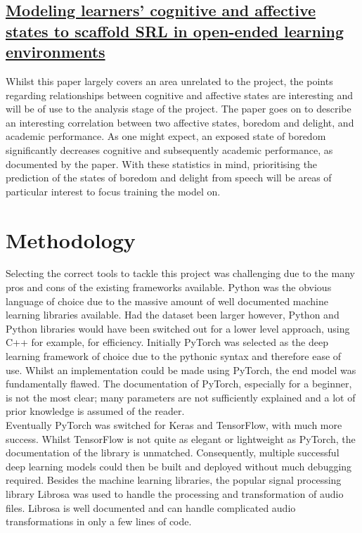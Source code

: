\documentclass[12pt]{article}
\begin{document}
\subsection{\href{https://www.researchgate.net/profile/Ryan-Baker-2/publication/326217846_Modeling_Learners'_Cognitive_and_Affective_States_to_Scaffold_SRL_in_Open-Ended_Learning_Environments/links/5b560a4245851507a7c3f516/Modeling-Learners-Cognitive-and-Affective-States-to-Scaffold-SRL-in-Open-Ended-Learning-Environments.pdf}{Modeling learners' cognitive and affective states to scaffold SRL in open-ended learning environments}}
Whilst this paper largely covers an area unrelated to the project, the points regarding relationships between cognitive and affective states are interesting and will be of use to the analysis stage of the project. The paper goes on to describe an interesting correlation between two affective states, boredom and delight, and academic performance. As one might expect, an exposed state of boredom significantly decreases cognitive and subsequently academic performance, as documented by the paper. With these statistics in mind, prioritising the prediction of the states of boredom and delight from speech will be areas of particular interest to focus training the model on.
\section{Methodology}
Selecting the correct tools to tackle this project was challenging due to the many pros and cons of the existing frameworks available. Python was the obvious language of choice due to the massive amount of well documented machine learning libraries available. Had the dataset been larger however, Python and Python libraries would have been switched out for a lower level approach, using C++ for example, for efficiency. Initially PyTorch was selected as the deep learning framework of choice due to the pythonic syntax and therefore ease of use. Whilst an implementation could be made using PyTorch, the end model was fundamentally flawed. The documentation of PyTorch, especially for a beginner, is not the most clear; many parameters are not sufficiently explained and a lot of prior knowledge is assumed of the reader.
\\

\noindent Eventually PyTorch was switched for Keras and TensorFlow, with much more success. Whilst TensorFlow is not quite as elegant or lightweight as PyTorch, the documentation of the library is unmatched. Consequently, multiple successful deep learning models could then be built and deployed without much debugging required. Besides the machine learning libraries, the popular signal processing library Librosa was used to handle the processing and transformation of audio files. Librosa is well documented and can handle complicated audio transformations in only a few lines of code.
\end{document}
